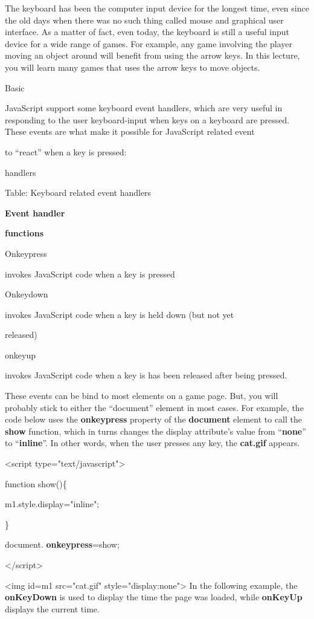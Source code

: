\documentclass[
]{article}
\begin{document}
The keyboard has been the computer input device for the longest time,
even since the old days when there was no such thing called mouse and
graphical user interface. As a matter of fact, even today, the keyboard
is still a useful input device for a wide range of games. For example,
any game involving the player moving an object around will benefit from
using the arrow keys. In this lecture, you will learn many games that
uses the arrow keys to move objects.

Basic

JavaScript support some keyboard event handlers, which are very useful
in responding to the user keyboard-input when keys on a keyboard are
pressed. These events are what make it possible for JavaScript related
event

to ``react'' when a key is pressed:

handlers

Table: Keyboard related event handlers

\textbf{Event handler}

\textbf{functions}

Onkeypress

invokes JavaScript code when a key is pressed

Onkeydown

invokes JavaScript code when a key is held down (but not yet

released)

onkeyup

invokes JavaScript code when a key is has been released after being
pressed.

These events can be bind to most elements on a game page. But, you will
probably stick to either the ``document'' element in most cases. For
example, the code below uses the \textbf{onkeypress} property of the
\textbf{document} element to call the \textbf{show} function, which in
turns changes the display attribute's value from ``\textbf{none}'' to
``\textbf{inline}''. In other words, when the user presses any key, the
\textbf{cat.gif} appears.

\textless script type="text/javascript"\textgreater{}

function show()\{

m1.style.display="inline";

\}

document. \textbf{onkeypress}=show;

\textless/script\textgreater{}

\textless img id=m1 src="cat.gif" style="display:none"\textgreater{} In
the following example, the \textbf{onKeyDown} is used to display the
time the page was loaded, while \textbf{onKeyUp} displays the current
time.
\end{document}
